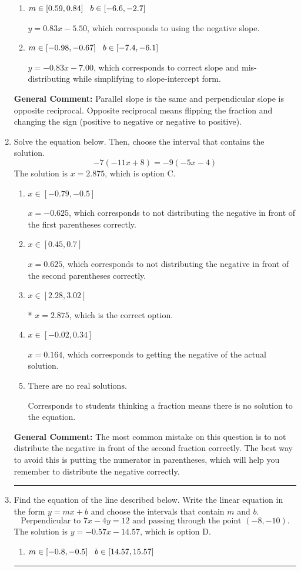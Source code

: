 \documentclass{extbook}[14pt]
\newcommand{\litem}[1]{\item #1

\rule{\textwidth}{0.4pt}}
\begin{document}
\begin{enumerate}
{\begin{enumerate}[label=\Alph*.]
* $y = -0.83x + 9.50$, which is the correct option.
\item \( m \in [0.59, 0.84] \hspace*{3mm} b \in [-6.6, -2.7] \)

 $y = 0.83x - 5.50$, which corresponds to using the negative slope.
\item \( m \in [-0.98, -0.67] \hspace*{3mm} b \in [-7.4, -6.1] \)

 $y = -0.83x - 7.00$, which corresponds to correct slope and mis-distributing while simplifying to slope-intercept form.
\end{enumerate}

\textbf{General Comment:} Parallel slope is the same and perpendicular slope is opposite reciprocal. Opposite reciprocal means flipping the fraction and changing the sign (positive to negative or negative to positive).
}
\litem{
Solve the equation below. Then, choose the interval that contains the solution.
\[ -7(-11x + 8) = -9(-5x -4) \]The solution is \( x = 2.875 \), which is option C.\begin{enumerate}[label=\Alph*.]
\item \( x \in [-0.79, -0.5] \)

$x = -0.625$, which corresponds to not distributing the negative in front of the first parentheses correctly.
\item \( x \in [0.45, 0.7] \)

$x = 0.625$, which corresponds to not distributing the negative in front of the second parentheses correctly.
\item \( x \in [2.28, 3.02] \)

* $x = 2.875$, which is the correct option.
\item \( x \in [-0.02, 0.34] \)

$x = 0.164$, which corresponds to getting the negative of the actual solution.
\item \( \text{There are no real solutions.} \)

Corresponds to students thinking a fraction means there is no solution to the equation.
\end{enumerate}

\textbf{General Comment:} The most common mistake on this question is to not distribute the negative in front of the second fraction correctly. The best way to avoid this is putting the numerator in parentheses, which will help you remember to distribute the negative correctly.
}
\litem{
Find the equation of the line described below. Write the linear equation in the form $ y=mx+b $ and choose the intervals that contain $m$ and $b$.
\[ \text{Perpendicular to } 7 x - 4 y = 12 \text{ and passing through the point } (-8, -10). \]The solution is \( y = -0.57x - 14.57 \), which is option D.\begin{enumerate}[label=\Alph*.]
\item \( m \in [-0.8, -0.5] \hspace*{3mm} b \in [14.57, 15.57] \)


\end{enumerate}}
\end{enumerate}
\end{document}
